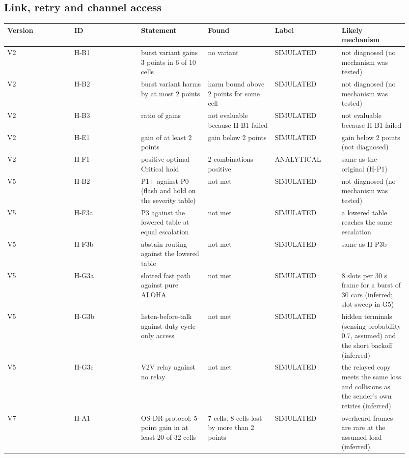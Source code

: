 \subsection*{Link, retry and channel access}

{\scriptsize\raggedright
\begin{longtable}{p{0.158\linewidth}p{0.158\linewidth}p{0.158\linewidth}p{0.158\linewidth}p{0.158\linewidth}p{0.158\linewidth}}
\toprule
Version & ID & Statement & Found & Label & Likely mechanism \\
\midrule
\endhead
V2 & H-B1 & burst variant gains 3 points in 6 of 10 cells & no variant & SIMULATED & not diagnosed (no mechanism was tested) \\
V2 & H-B2 & burst variant harms by at most 2 points & harm bound above 2 points for some cell & SIMULATED & not diagnosed (no mechanism was tested) \\
V2 & H-B3 & ratio of gains & not evaluable because H-B1 failed & SIMULATED & not evaluable because H-B1 failed \\
V2 & H-E1 & gain of at least 2 points & gain below 2 points & SIMULATED & gain below 2 points (not diagnosed) \\
V2 & H-F1 & positive optimal Critical hold & 2 combinations positive & ANALYTICAL & same as the original (H-P1) \\
V5 & H-B2 & P1+ against P0 (flash and hold on the severity table) & not met & SIMULATED & not diagnosed (no mechanism was tested) \\
V5 & H-F3a & P3 against the lowered table at equal escalation & not met & SIMULATED & a lowered table reaches the same escalation \\
V5 & H-F3b & abstain routing against the lowered table & not met & SIMULATED & same as H-P3b \\
V5 & H-G3a & slotted fast path against pure ALOHA & not met & SIMULATED & 8 slots per 30 s frame for a burst of 30 cars (inferred; slot sweep in G5) \\
V5 & H-G3b & listen-before-talk against duty-cycle-only access & not met & SIMULATED & hidden terminals (sensing probability 0.7, assumed) and the short backoff (inferred) \\
V5 & H-G3c & V2V relay against no relay & not met & SIMULATED & the relayed copy meets the same loss and collisions as the sender's own retries (inferred) \\
V7 & H-A1 & OS-DR protocol: 5-point gain in at least 20 of 32 cells & 7 cells; 8 cells lost by more than 2 points & SIMULATED & overheard frames are rare at the assumed load (inferred) \\

\end{longtable}}
